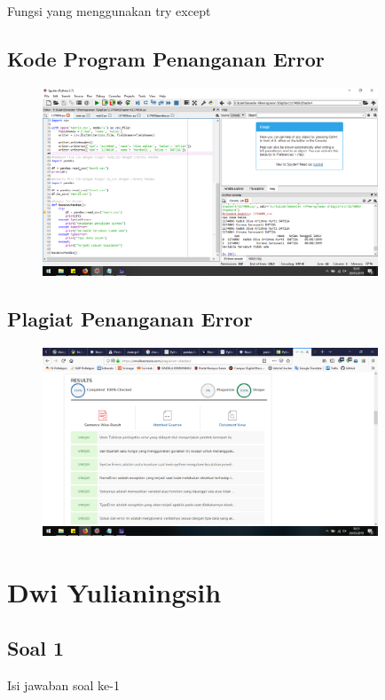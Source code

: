 Fungsi yang menggunakan try except


\subsection{Kode Program Penanganan Error}
\begin{figure}[H]
	\includegraphics[width=10cm]{figures/4/1174006/Praktek/p1.png}
	\centering
\end{figure}

\subsection{Plagiat Penanganan Error}
\begin{figure}[H]
	\includegraphics[width=10cm]{figures/4/1174006/Praktek/plagiatpenanganan.png}
	\centering
\end{figure}


\section{Dwi Yulianingsih}
\subsection{Soal 1}
Isi jawaban soal ke-1

